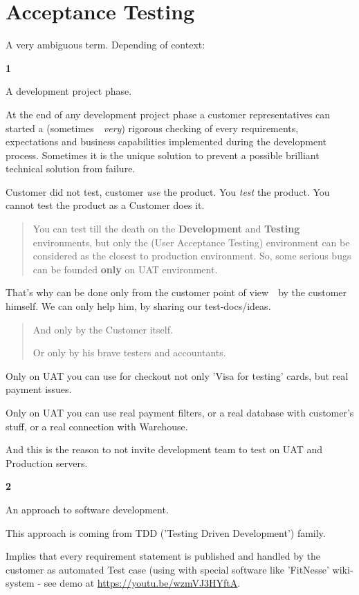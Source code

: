 \section{Acceptance Testing}
\label{sec:Acceptance Testing}

A very ambiguous term. Depending of context:

\textbf{1}

A development project phase.

At the end of any development project phase a customer representatives can started a (sometimes~\textemdash~\emph{very}) rigorous checking of every requirements, expectations and business capabilities implemented during the development process. Sometimes it is the unique solution to prevent a possible brilliant technical solution from failure.

Customer did not test, customer \emph{use} the product. You \emph{test} the product. You cannot test the product as a Customer does it.

\begin{quote}
You can test till the death on the \textbf{Development} and \textbf{Testing} environments, but only the  (User Acceptance Testing) environment can be considered as the closest to production environment. So, some serious bugs can be founded \textbf{only} on UAT environment.                                                                                                                                                                                                                                                                                                                                             \end{quote} 

That's why  can be done only from the customer point of view~\textemdash~by the customer himself. We can only help him, by sharing our test-docs/ideas.

\begin{quote}
And only by the Customer itself. 

Or only by his brave testers and accountants.
\end{quote}

Only on UAT you can use for checkout not only 'Visa for testing' cards, but real payment issues.

Only on UAT you can use real payment filters, or a real database with customer's stuff, or a real connection with Warehouse.

And this is the reason to not invite development team to test on UAT and Production servers.

\textbf{2}

An approach to software development.

This approach is coming from TDD ('Testing Driven Development') family.

Implies that every requirement statement is published and handled by the customer as automated Test case (using with special software like 'FitNesse' wiki-system - see demo at \url{https://youtu.be/wzmVJ3HYftA}.
